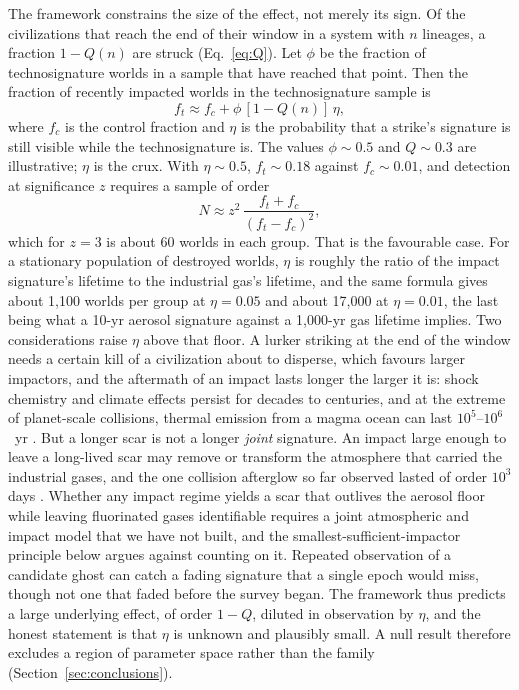 \documentclass[preprint,12pt]{elsarticle}
\theoremstyle{definition}
\begin{document}
The framework constrains the size of the effect, not merely its sign. Of the civilizations that reach the end of their window in a system with $n$ lineages, a fraction $1 - Q(n)$ are struck (Eq.~\ref{eq:Q}). Let $\phi$ be the fraction of technosignature worlds in a sample that have reached that point. Then the fraction of recently impacted worlds in the technosignature sample is
\begin{equation}
f_{t} \approx f_{c} + \phi\,[1 - Q(n)]\,\eta ,
\end{equation}
where $f_{c}$ is the control fraction and $\eta$ is the probability that a strike's signature is still visible while the technosignature is. The values $\phi \sim 0.5$ and $Q \sim 0.3$ are illustrative; $\eta$ is the crux. With $\eta \sim 0.5$, $f_{t} \sim 0.18$ against $f_{c} \sim 0.01$, and detection at significance $z$ requires a sample of order
\begin{equation}
N \approx z^{2}\,\frac{f_{t} + f_{c}}{(f_{t} - f_{c})^{2}} ,
\end{equation}
which for $z = 3$ is about 60 worlds in each group. That is the favourable case. For a stationary population of destroyed worlds, $\eta$ is roughly the ratio of the impact signature's lifetime to the industrial gas's lifetime, and the same formula gives about 1,100 worlds per group at $\eta = 0.05$ and about 17,000 at $\eta = 0.01$, the last being what a 10-yr aerosol signature against a 1,000-yr gas lifetime implies. Two considerations raise $\eta$ above that floor. A lurker striking at the end of the window needs a certain kill of a civilization about to disperse, which favours larger impactors, and the aftermath of an impact lasts longer the larger it is: shock chemistry and climate effects persist for decades to centuries, and at the extreme of planet-scale collisions, thermal emission from a magma ocean can last $10^{5}$--$10^{6}$~yr \citep{Lupu2014}. But a longer scar is not a longer \emph{joint} signature. An impact large enough to leave a long-lived scar may remove or transform the atmosphere that carried the industrial gases, and the one collision afterglow so far observed lasted of order $10^{3}$ days \citep{Kenworthy2023}. Whether any impact regime yields a scar that outlives the aerosol floor while leaving fluorinated gases identifiable requires a joint atmospheric and impact model that we have not built, and the smallest-sufficient-impactor principle below argues against counting on it. Repeated observation of a candidate ghost can catch a fading signature that a single epoch would miss, though not one that faded before the survey began. The framework thus predicts a large underlying effect, of order $1 - Q$, diluted in observation by $\eta$, and the honest statement is that $\eta$ is unknown and plausibly small. A null result therefore excludes a region of parameter space rather than the family (Section~\ref{sec:conclusions}).
\end{document}
